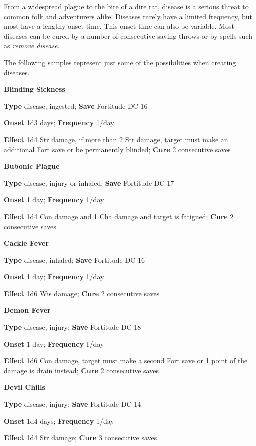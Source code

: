 				
From a widespread plague to the bite of a dire rat, disease is a serious threat to common folk and adventurers alike. Diseases rarely have a limited frequency, but most have a lengthy onset time. This onset time can also be variable. Most diseases can be cured by a number of consecutive saving throws or by spells such as \textit{remove disease}.
				
The following samples represent just some of the possibilities when creating diseases.
				
\textbf{Blinding Sickness }
				
\textbf{Type} disease, ingested; \textbf{Save} Fortitude DC 16 
				
\textbf{Onset }1d3 days; \textbf{Frequency} 1/day
				
\textbf{Effect }1d4 Str damage, if more than 2 Str damage, target must make an additional Fort save or be permanently blinded;\textbf{ Cure} 2 consecutive saves
				
\textbf{Bubonic Plague}
				
\textbf{Type} disease, injury or inhaled; \textbf{Save} Fortitude DC 17
				
\textbf{Onset }1 day; \textbf{Frequency} 1/day
				
\textbf{Effect }1d4 Con damage and 1 Cha damage and target is fatigued;\textbf{ Cure} 2 consecutive saves
				
\textbf{Cackle Fever }
				
\textbf{Type} disease, inhaled; \textbf{Save} Fortitude DC 16 
				
\textbf{Onset }1 day; \textbf{Frequency} 1/day
				
\textbf{Effect }1d6 Wis damage;\textbf{ Cure} 2 consecutive saves
				
\textbf{Demon Fever }
				
\textbf{Type} disease, injury; \textbf{Save} Fortitude DC 18 
				
\textbf{Onset }1 day; \textbf{Frequency} 1/day
				
\textbf{Effect }1d6 Con damage, target must make a second Fort save or 1 point of the damage is drain instead;\textbf{ Cure} 2 consecutive saves
				
\textbf{Devil Chills }
				
\textbf{Type} disease, injury; \textbf{Save} Fortitude DC 14 
				
\textbf{Onset }1d4 days; \textbf{Frequency} 1/day
				
\textbf{Effect }1d4 Str damage;\textbf{ Cure} 3 consecutive saves
				
